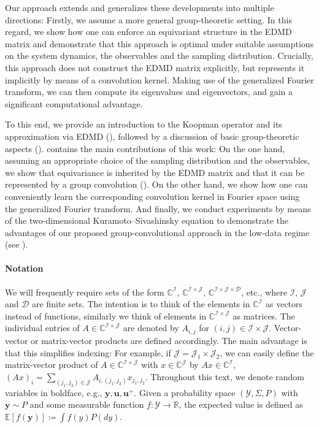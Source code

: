 \documentclass[preprint,12pt,authoryear]{elsarticle}
\newcommand{\R}{\mathbb{R}}
\newcommand{\C}{\mathbb{C}}
\newcommand\Ic{\mathcal I}
\newcommand\Jc{\mathcal J}
\newcommand\Yc{\mathcal Y}
\newcommand\Dc{\mathcal D}
\begin{document}
Our approach extends and generalizes these developments into multiple directions: Firstly, we assume a more general group-theoretic setting.
In this regard, we show how one can enforce an equivariant structure in the EDMD matrix and demonstrate that this approach is optimal under suitable %
assumptions on the system dynamics, the observables and the sampling distribution. 
Crucially, this approach does not construct the EDMD matrix explicitly, but represents it implicitly by means of a convolution kernel. Making use of the generalized Fourier transform, we can then compute its eigenvalues and eigenvectors, and gain a significant computational advantage.


To this end, we provide an introduction to the Koopman operator and its approximation via EDMD (), followed by a discussion of basic group-theoretic aspects ().  contains the main contributions of this work: %
On the one hand, assuming an appropriate choice of the sampling distribution and the observables, we show that equivariance is inherited by the EDMD matrix
and that it can be represented by a group convolution (). %
On the other hand, we show how one can conveniently learn the corresponding convolution kernel in Fourier space using the generalized Fourier transform. And finally, we conduct experiments by means of %
the two-dimensional Kuramoto--Sivashinsky equation %
to demonstrate the advantages of our proposed %
group-convolutional approach in the low-data regime (see ).

\paragraph{Notation}
We will frequently require sets of the form $\C^{\Ic}$, $\C^{\Ic \times \Jc}$, $\C^{\Ic \times \Jc \times \Dc}$, etc., where $\Ic$, $\Jc$ and $\Dc$ are finite sets. The intention is to think of the elements in $\C^{\Ic}$ as vectors instead of functions, similarly we think of elements in $\C^{\Ic \times \Jc}$ as matrices. The individual entries of $A \in \C^{\Ic \times \Jc}$ are denoted by $A_{i,j}$ for $(i,j) \in \Ic \times \Jc$.
Vector-vector or matrix-vector products are defined accordingly. The main advantage is that this simplifies indexing: For example, if $\Jc = \Jc_1 \times \Jc_2$, we can easily define the matrix-vector product of $A \in \C^{\Ic \times \Jc}$ with $x \in \C^{\Jc}$ by $A x \in \C^{\Ic}$, $(A x)_i = \sum_{(j_1,j_2) \in \Jc} A_{i,(j_1,j_2)} x_{j_1,j_2}$. Throughout this text, we denote random variables in boldface, e.g., $\bm y, \bm u, \bm u^+$. Given a probability space $(\Yc,\Sigma,P)$ with $\bm y \sim P$ and some measurable function $f : \Yc \rightarrow \R$, the expected value is defined as $\mathbb E[f(\bm y)] \coloneqq \int f(y) P(dy)$.
\end{document}
